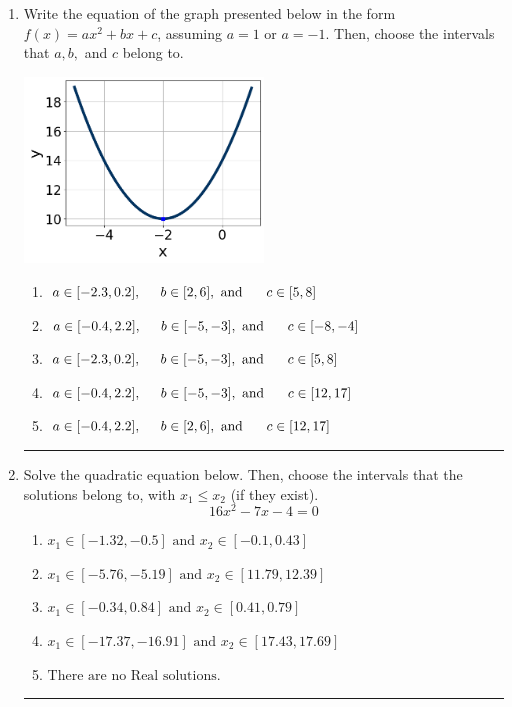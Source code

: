 \documentclass[14pt]{extbook}
\newcommand{\litem}[1]{\item#1\hspace*{-1cm}\rule{\textwidth}{0.4pt}}
\begin{document}
\begin{enumerate}
{\begin{enumerate}[label=\Alph*.]
\end{enumerate} }
\litem{
Write the equation of the graph presented below in the form $f(x)=ax^2+bx+c$, assuming  $a=1$ or $a=-1$. Then, choose the intervals that $a, b,$ and $c$ belong to.
\begin{center}
    \includegraphics[width=0.5\textwidth]{../Figures/quadraticGraphToEquationCopyC.png}
\end{center}
\begin{enumerate}[label=\Alph*.]
\item \( a \in [-2.3, 0.2], \hspace*{5mm} b \in [2, 6], \text{ and } \hspace*{5mm} c \in [5, 8] \)
\item \( a \in [-0.4, 2.2], \hspace*{5mm} b \in [-5, -3], \text{ and } \hspace*{5mm} c \in [-8, -4] \)
\item \( a \in [-2.3, 0.2], \hspace*{5mm} b \in [-5, -3], \text{ and } \hspace*{5mm} c \in [5, 8] \)
\item \( a \in [-0.4, 2.2], \hspace*{5mm} b \in [-5, -3], \text{ and } \hspace*{5mm} c \in [12, 17] \)
\item \( a \in [-0.4, 2.2], \hspace*{5mm} b \in [2, 6], \text{ and } \hspace*{5mm} c \in [12, 17] \)

\end{enumerate} }
\litem{
Solve the quadratic equation below. Then, choose the intervals that the solutions belong to, with $x_1 \leq x_2$ (if they exist).\[ 16x^{2} -7 x -4 = 0 \]\begin{enumerate}[label=\Alph*.]
\item \( x_1 \in [-1.32, -0.5] \text{ and } x_2 \in [-0.1, 0.43] \)
\item \( x_1 \in [-5.76, -5.19] \text{ and } x_2 \in [11.79, 12.39] \)
\item \( x_1 \in [-0.34, 0.84] \text{ and } x_2 \in [0.41, 0.79] \)
\item \( x_1 \in [-17.37, -16.91] \text{ and } x_2 \in [17.43, 17.69] \)
\item \( \text{There are no Real solutions.} \)

\end{enumerate} }
\end{enumerate}
\end{document}

